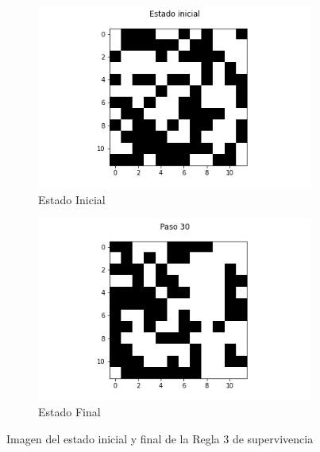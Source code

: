 \documentclass{article}
\begin{document}
\begin{figure}[H]
\centering
\begin{subfigure}[b]{0.45\linewidth}
\includegraphics[width=\linewidth]{p2_r3_t00_p.png}
\caption{Estado Inicial}
\end{subfigure}
\begin{subfigure}[b]{0.45\linewidth}
\includegraphics[width=\linewidth]{p2_r3_t30_p.png}
\caption{Estado Final}
\end{subfigure}
\caption{Imagen del estado inicial y final de la Regla 3 de supervivencia}
\label{fig:westminster}
\end{figure}
\end{document}
